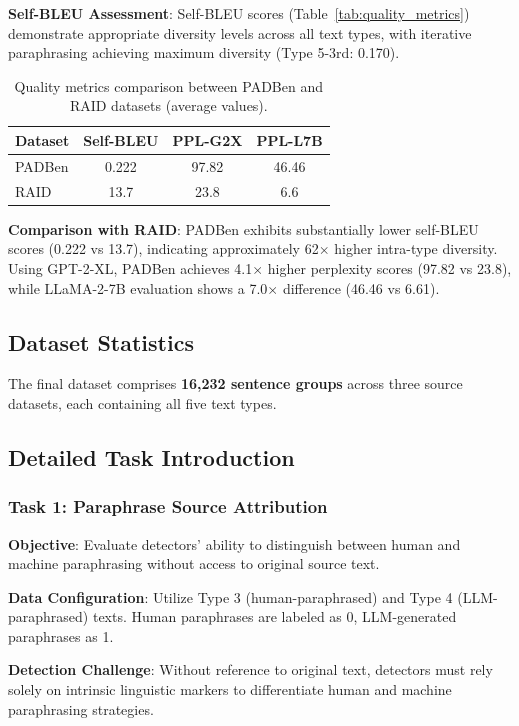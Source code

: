 \textbf{Self-BLEU Assessment}: Self-BLEU scores (Table~\ref{tab:quality_metrics}) demonstrate appropriate diversity levels across all text types, with iterative paraphrasing achieving maximum diversity (Type 5-3rd: 0.170).

\begin{table}[htbp]
\centering
\caption{Quality metrics comparison between PADBen and RAID datasets (average values).}
\label{tab:dataset_comparison}
\begin{tabular}{lccc}
\hline
\textbf{Dataset} & \textbf{Self-BLEU} & \textbf{PPL-G2X} & \textbf{PPL-L7B} \\
\hline
PADBen & 0.222 & 97.82 & 46.46 \\
RAID & 13.7 & 23.8 & 6.6 \\
\hline
\end{tabular}
\end{table}

\textbf{Comparison with RAID}: PADBen exhibits substantially lower self-BLEU scores (0.222 vs 13.7), indicating approximately 62$\times$ higher intra-type diversity. Using GPT-2-XL, PADBen achieves 4.1$\times$ higher perplexity scores (97.82 vs 23.8), while LLaMA-2-7B evaluation shows a 7.0$\times$ difference (46.46 vs 6.61).

\subsection{Dataset Statistics}
The final dataset comprises \textbf{16,232 sentence groups} across three source datasets, each containing all five text types.

\subsection{Detailed Task Introduction}
\label{appC:task_intro}

\subsubsection{Task 1: Paraphrase Source Attribution}
\textbf{Objective}: Evaluate detectors' ability to distinguish between human and machine paraphrasing without access to original source text.

\textbf{Data Configuration}: Utilize Type 3 (human-paraphrased) and Type 4 (LLM-paraphrased) texts. Human paraphrases are labeled as 0, LLM-generated paraphrases as 1.

\textbf{Detection Challenge}: Without reference to original text, detectors must rely solely on intrinsic linguistic markers to differentiate human and machine paraphrasing strategies.

